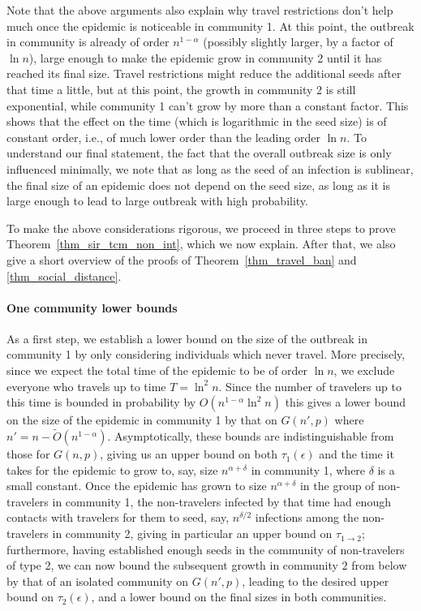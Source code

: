 \documentclass[11pt]{article}
\begin{document}
Note that the above arguments also explain why travel restrictions don't help much once the epidemic is noticeable in community 1.  At this point, the outbreak in community is already of order $n^{1-\alpha}$ (possibly slightly larger, by a factor of $\ln n$), large enough to make the epidemic grow in community 2 until it has reached its final size.  Travel restrictions might reduce the additional seeds after that time a little, but at this point, the growth in community 2 is still exponential, while community 1 can't grow by more than a constant factor. This shows that the effect on the time (which is logarithmic in the seed size) is of constant order, i.e., of much lower order than the leading order $\ln n$.  To understand our final statement, the fact that the overall outbreak size is only influenced minimally, we note that as long as the seed of an infection is sublinear, the final size of an epidemic does not depend on the seed size, as long as it is large enough to lead to large outbreak with high probability.

To make the above considerations rigorous, we proceed in three steps to prove Theorem~\ref{thm_sir_tcm_non_int}, which we now explain.  After that, we also give a short overview of the proofs of Theorem~\ref{thm_travel_ban} and \ref{thm_social_distance}.

\paragraph{One community lower bounds}
As a first step, we establish a lower bound on the size of the outbreak in community 1 by only considering individuals which never travel.  More precisely, since we expect the total time of the epidemic to be of order $\ln n$, we exclude everyone who travels up to time $T = \ln^2 n$.
Since the number of travelers up to this time is bounded in probability by $ O(n^{1-\alpha}\ln^2n)$ this gives a lower bound on the size of the epidemic in community 1 by that on $G(n',p)$ where $n'=n-\tilde O(n^{1-\alpha})$.  Asymptotically, these bounds are indistinguishable from those for $G(n,p)$, giving us an upper bound on both $\tau_1(\epsilon)$ and the time it takes for the epidemic to grow to, say, size $n^{\alpha+\delta}$ in community 1, where $\delta$ is a small constant. Once the epidemic has grown to size $n^{\alpha+\delta}$ in the group of non-travelers in community 1, the 
non-travelers infected by that time had enough contacts with travelers for them to seed, say, $n^{\delta/2}$
infections among the non-travelers in community 2,
giving in particular an upper bound on $\tau_{1\to 2}$; furthermore, having established enough seeds in the community of non-travelers of type 2,
we can now  bound the subsequent growth in community $2$ from below by that of an isolated community on $G(n',p)$, leading to the desired upper bound on $\tau_2(\epsilon)$, and a lower bound on the final sizes in both communities.
\end{document}
